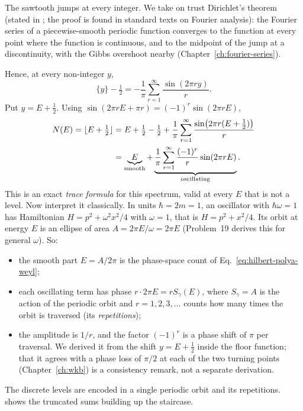 \begin{beyond}
The sawtooth jumps at every integer. We take on trust Dirichlet's theorem (stated in \cite{rhb}; the proof is found in standard texts on Fourier analysis): the Fourier series of a piecewise-smooth periodic function converges to the function at every point where the function is continuous, and to the midpoint of the jump at a discontinuity, with the Gibbs overshoot nearby (Chapter~\ref{ch:fourier-series}).
\end{beyond}
Hence, at every non-integer $y$,
\begin{equation}
\{y\}-\tfrac12=-\frac1\pi\sum_{r=1}^\infty\frac{\sin(2\pi ry)}{r}.
\label{eq:hilbert-polya-sawtooth}
\end{equation}
Put $y=E+\tfrac12$. Using $\sin(2\pi r E+\pi r)=(-1)^r\sin(2\pi rE)$,
\begin{align}
N(E)=\lfloor E+\tfrac12\rfloor
&=E+\tfrac12-\tfrac12+\frac1\pi\sum_{r=1}^\infty\frac{\sin\bigl(2\pi r(E+\tfrac12)\bigr)}{r}\notag\\
&=\underbrace{E}_{\text{smooth}}+\underbrace{\frac1\pi\sum_{r=1}^\infty\frac{(-1)^r}{r}\sin(2\pi rE)}_{\text{oscillating}} .
\label{eq:hilbert-polya-osctrace}
\end{align}
This is an exact \emph{trace formula} for this spectrum, valid at every $E$ that is not a level. Now interpret it classically. In units $\hbar=2m=1$, an oscillator with $\hbar\omega=1$ has Hamiltonian $H=p^2+\omega^2x^2/4$ with $\omega=1$, that is $H=p^2+x^2/4$. Its orbit at energy $E$ is an ellipse of area $A=2\pi E/\omega=2\pi E$ (Problem~19 derives this for general $\omega$). So:
\begin{itemize}
\item the smooth part $E=A/2\pi$ is the phase-space count of Eq.~\eqref{eq:hilbert-polya-weyl};
\item each oscillating term has phase $r\cdot2\pi E=rS_\gamma(E)$, where $S_\gamma=A$ is the action of the periodic orbit and $r=1,2,3,\dots$ counts how many times the orbit is traversed (its \emph{repetitions});
\item the amplitude is $1/r$, and the factor $(-1)^r$ is a phase shift of $\pi$ per traversal. We derived it from the shift $y=E+\tfrac12$ inside the floor function; that it agrees with a phase loss of $\pi/2$ at each of the two turning points (Chapter~\ref{ch:wkb}) is a consistency remark, not a separate derivation.
\end{itemize}
The discrete levels are encoded in a single periodic orbit and its repetitions.  shows the truncated sums building up the staircase.

